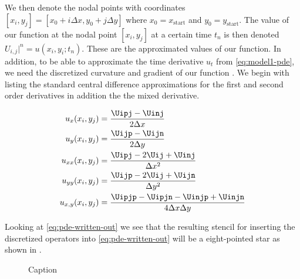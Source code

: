 We then denote the nodal points with coordinates $[x_i, y_j] = [x_0 + i\Delta x, y_0+j\Delta y]$ where $x_0 = x_{\text{start}}$ and $y_0 = y_{\text{start}}$. The value of our function \uxt at the nodal point $[x_i, y_j]$  at a certain time $t_n$ is then denoted $U_{i, j}|^n = u(x_i, y_i; t_n)$. These are the approximated values of our function. In addition, to be able to approximate the time derivative $u_t$ from \eqref{eq:model1-pde}, we need the discretized curvature and gradient of our function \uxt. We begin with listing the standard central difference approximations for the first and second order derivatives in addition the the mixed derivative.

\begin{align}
    u_x (x_i, y_j) &= \frac{\Uipj - \Uinj}{2\Delta x} \label{eq:x-deriv}\\
    u_y (x_i, y_j) &= \frac{\Uijp - \Uijn}{2\Delta y} \label{eq:y-deriv} \\
    u_{xx} (x_i, y_j) &= \frac{\Uipj-2\Uij+\Uinj}{\Delta x ^2} \label{eq:x-doublederiv} \\
    u_{yy} (x_i, y_j) &= \frac{\Uijp - 2\Uij + \Uijn}{\Delta y^2} \label{eq:y-doublederiv} \\
    u_{x, y} (x_i, y_j) &= \frac{\Uipjp-\Uipjn-\Uinjp+\Uinjn}{4\Delta x \Delta y}
\end{align}

Looking at \eqref{eq:pde-written-out} we see that the resulting stencil for inserting the discretized operators into \eqref{eq:pde-written-out} will be a eight-pointed star as shown in .


\begin{figure}
    \centering
    
    \caption{Caption}
    \label{fig:stencil+grid}
\end{figure}



\clearpage